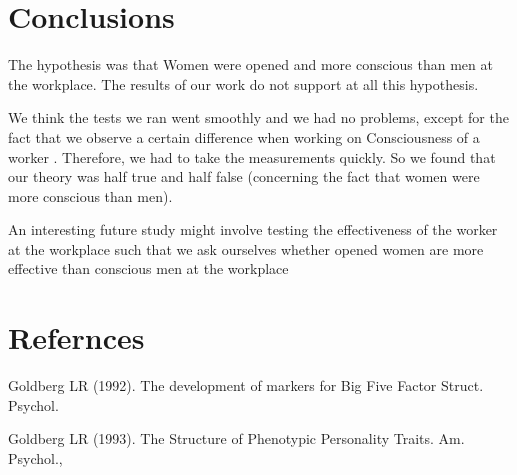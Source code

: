 \section{Conclusions}\label{Sec:Conc}
The  hypothesis was that Women were opened and more conscious than men at the workplace. The  results of our work  do not  support at all this hypothesis.

We think the tests we ran went  smoothly and we had no problems, except for the fact that we observe a certain difference when working on Consciousness of a worker . Therefore, we had to take the measurements quickly. So we found that our theory was half true and half false (concerning the fact that women were more conscious than men).

An interesting future study might involve testing the effectiveness of the worker at the workplace such that we ask ourselves whether opened women are more effective than conscious men at the workplace





\section{Refernces}

Goldberg LR (1992). The development of markers for Big Five Factor
Struct. Psychol.

Goldberg LR (1993). The Structure of Phenotypic Personality Traits.
Am. Psychol., 
 

 
  

